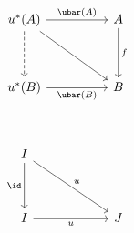 \[\begin{tikzcd}
	{u^{*}(A)} && A \\
	\\
	{u^{*}(B)} && B \\
	\\
	I \\
	\\
	I && J
	\arrow["f", from=1-3, to=3-3]
	\arrow["{\ubar(A)}", from=1-1, to=1-3]
	\arrow["{\ubar(B)}"', from=3-1, to=3-3]
	\arrow["u"', from=7-1, to=7-3]
	\arrow[from=1-1, to=3-3]
	\arrow["u", from=5-1, to=7-3]
	\arrow["\id"', from=5-1, to=7-1]
	\arrow[dashed, from=1-1, to=3-1]
\end{tikzcd}\]